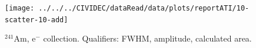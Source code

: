 %
%
%
%
%
%


\clearpage
\begin{figure}[!t]
\centering
\texttt{[image: ../../../CIVIDEC/dataRead/data/plots/reportATI/10-scatter-10-add]}
\caption{$^{241}$Am, e$^{-}$ collection. Qualifiers: FWHM, amplitude, calculated area.}
\label{fig:scatterae}
\end{figure}


\clearpage
